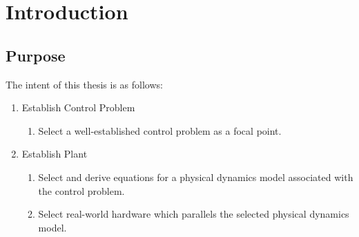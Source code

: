 \documentclass[crop=false,float=true,class=scrreprt]{standalone}
\begin{document}
\chapter{Introduction}





\section{Purpose}

The intent of this thesis is as follows:

\begin{enumerate}[leftmargin=*]

\item Establish Control Problem

\begin{enumerate}[leftmargin=*]                                                                        \vspace{-1em}
      
  \item Select a well-established control problem as a focal point.                                   %
      
\end{enumerate}                                                                                        \vspace{-0.5em}
      
\item Establish Plant

\begin{enumerate}[leftmargin=*]                                                                        \vspace{-1em}
      
  \item Select and derive equations for a physical dynamics model associated with the control problem. \\
                                       \vspace{-1em}

  \item Select real-world hardware which parallels the selected physical dynamics model.
                                                               \vspace{-1em}


\end{enumerate}
\end{enumerate}
\end{document}
